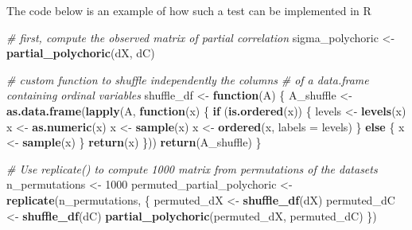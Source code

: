\documentclass[
]{book}
\newenvironment{Shaded}{\begin{snugshade}}{\end{snugshade}}
\newcommand{\AttributeTok}[1]{\textcolor[rgb]{0.13,0.29,0.53}{#1}}
\newcommand{\CommentTok}[1]{\textcolor[rgb]{0.56,0.35,0.01}{\textit{#1}}}
\newcommand{\ControlFlowTok}[1]{\textcolor[rgb]{0.13,0.29,0.53}{\textbf{#1}}}
\newcommand{\DecValTok}[1]{\textcolor[rgb]{0.00,0.00,0.81}{#1}}
\newcommand{\FunctionTok}[1]{\textcolor[rgb]{0.13,0.29,0.53}{\textbf{#1}}}
\newcommand{\NormalTok}[1]{#1}
\newcommand{\OtherTok}[1]{\textcolor[rgb]{0.56,0.35,0.01}{#1}}
\begin{document}
The code below is an example of how such a test can be implemented in R

\begin{Shaded}
\begin{Highlighting}[]
\CommentTok{\# first, compute the observed matrix of partial correlation}
\NormalTok{sigma\_polychoric }\OtherTok{\textless{}{-}} \FunctionTok{partial\_polychoric}\NormalTok{(dX, dC)}

\CommentTok{\# custom function to shuffle independently the columns }
\CommentTok{\# of a data.frame containing ordinal variables}
\NormalTok{shuffle\_df }\OtherTok{\textless{}{-}} \ControlFlowTok{function}\NormalTok{(A) \{}
\NormalTok{  A\_shuffle }\OtherTok{\textless{}{-}}  \FunctionTok{as.data.frame}\NormalTok{(}\FunctionTok{lapply}\NormalTok{(A, }\ControlFlowTok{function}\NormalTok{(x) \{}
    \ControlFlowTok{if}\NormalTok{ (}\FunctionTok{is.ordered}\NormalTok{(x)) \{}
\NormalTok{      levels }\OtherTok{\textless{}{-}} \FunctionTok{levels}\NormalTok{(x)}
\NormalTok{      x }\OtherTok{\textless{}{-}} \FunctionTok{as.numeric}\NormalTok{(x)}
\NormalTok{      x }\OtherTok{\textless{}{-}} \FunctionTok{sample}\NormalTok{(x)}
\NormalTok{      x }\OtherTok{\textless{}{-}} \FunctionTok{ordered}\NormalTok{(x, }\AttributeTok{labels =}\NormalTok{ levels)}
\NormalTok{    \} }\ControlFlowTok{else}\NormalTok{ \{}
\NormalTok{      x }\OtherTok{\textless{}{-}} \FunctionTok{sample}\NormalTok{(x)}
\NormalTok{    \}}
    \FunctionTok{return}\NormalTok{(x)}
\NormalTok{  \}))}
  \FunctionTok{return}\NormalTok{(A\_shuffle)}
\NormalTok{\}}

\CommentTok{\# Use replicate() to compute 1000 matrix from permutations of the datasets}
\NormalTok{n\_permutations }\OtherTok{\textless{}{-}} \DecValTok{1000}
\NormalTok{permuted\_partial\_polychoric }\OtherTok{\textless{}{-}} \FunctionTok{replicate}\NormalTok{(n\_permutations, \{}
\NormalTok{  permuted\_dX }\OtherTok{\textless{}{-}} \FunctionTok{shuffle\_df}\NormalTok{(dX)}
\NormalTok{  permuted\_dC }\OtherTok{\textless{}{-}} \FunctionTok{shuffle\_df}\NormalTok{(dC)}
  \FunctionTok{partial\_polychoric}\NormalTok{(permuted\_dX, permuted\_dC)}
\NormalTok{\})}


\end{Highlighting}
\end{Shaded}
\end{document}
